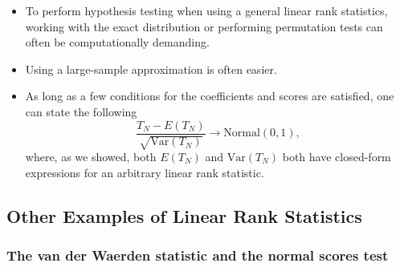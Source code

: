 \documentclass[]{book}
\begin{document}
\begin{itemize}
\item
  To perform hypothesis testing when using a general linear rank statistics,
  working with the exact distribution or performing permutation tests can
  often be computationally demanding.
\item
  Using a large-sample approximation is often easier.
\item
  As long as a few conditions for the coefficients and scores are satisfied,
  one can state the following
  \begin{equation}
  \frac{T_{N} - E( T_{N})}{\sqrt{\textrm{Var}(T_{N})}} \longrightarrow \textrm{Normal}(0, 1),
  \end{equation}
  where, as we showed, both \(E(T_{N})\) and \(\textrm{Var}(T_{N})\) both have closed-form expressions
  for an arbitrary linear rank statistic.
\end{itemize}

\hypertarget{other-examples-of-linear-rank-statistics}{%
\subsection{Other Examples of Linear Rank Statistics}\label{other-examples-of-linear-rank-statistics}}

\hypertarget{the-van-der-waerden-statistic-and-the-normal-scores-test}{%
\subsubsection{The van der Waerden statistic and the normal scores test}\label{the-van-der-waerden-statistic-and-the-normal-scores-test}}
\end{document}
